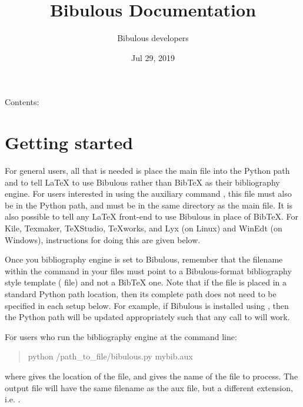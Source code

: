 \documentclass[letterpaper,10pt,english]{sphinxmanual}
\title{Bibulous Documentation}
\date{Jul 29, 2019}
\author{Bibulous developers}
\begin{document}
\maketitle
\sphinxtableofcontents
{}\label{\detokenize{index::doc}}


Contents:


\chapter{Getting started}
\label{\detokenize{getting_started:getting-started}}\label{\detokenize{getting_started::doc}}
For general users, all that is needed is place the main  file into the Python path and to tell LaTeX to use Bibulous rather than BibTeX as their bibliography engine. For users interested in using the auxiliary command , this file must also be in the Python path, and must be in the same directory as the main file. It is also possible to tell any LaTeX front-end to use Bibulous in place of BibTeX. For Kile, Texmaker, TeXStudio, TeXworks, and Lyx (on Linux) and WinEdt (on Windows), instructions for doing this are given below.

Once you bibliography engine is set to Bibulous, remember that the filename within the  command in your  files must point to a Bibulous-format bibliography style template ( file) and not a BibTeX one. Note that if the  file is placed in a standard Python path location, then its complete path does not need to be specified in each setup below. For example, if Bibulous is installed using , then the Python path will be updated appropriately such that any call to  will work.

For users who run the bibliography engine at the command line:
\begin{quote}

python /path\_to\_file/bibulous.py mybib.aux
\end{quote}

where  gives the location of the  file, and  gives the name of the file to process. The output file will have the same filename as the aux file, but a different extension, i.e. .
\end{document}
